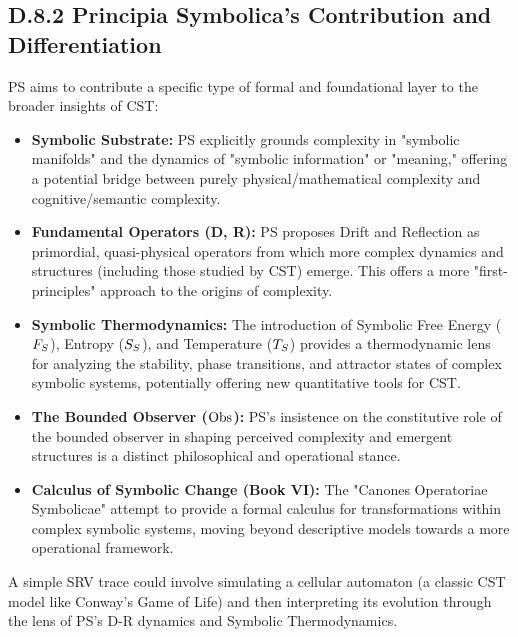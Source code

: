 \subsection*{D.8.2 Principia Symbolica's Contribution and Differentiation} \label{subsec:appD_cst_contribution_differentiation}
PS aims to contribute a specific type of formal and foundational layer to the broader insights of CST:
\begin{itemize}
    \item \textbf{Symbolic Substrate:} PS explicitly grounds complexity in "symbolic manifolds" and the dynamics of "symbolic information" or "meaning," offering a potential bridge between purely physical/mathematical complexity and cognitive/semantic complexity.
    \item \textbf{Fundamental Operators (D, R):} PS proposes Drift and Reflection as primordial, quasi-physical operators from which more complex dynamics and structures (including those studied by CST) emerge. This offers a more "first-principles" approach to the origins of complexity.
    \item \textbf{Symbolic Thermodynamics:} The introduction of Symbolic Free Energy (\(F_S\)), Entropy (\(S_S\)), and Temperature (\(T_S\)) provides a thermodynamic lens for analyzing the stability, phase transitions, and attractor states of complex symbolic systems, potentially offering new quantitative tools for CST.
    \item \textbf{The Bounded Observer (\(\mathrm{Obs}\)):} PS's insistence on the constitutive role of the bounded observer in shaping perceived complexity and emergent structures is a distinct philosophical and operational stance.
    \item \textbf{Calculus of Symbolic Change (Book VI):} The "Canones Operatoriae Symbolicae" attempt to provide a formal calculus for transformations within complex symbolic systems, moving beyond descriptive models towards a more operational framework.
\end{itemize}
A simple SRV trace could involve simulating a cellular automaton (a classic CST model like Conway's Game of Life) and then interpreting its evolution through the lens of PS's D-R dynamics and Symbolic Thermodynamics.
